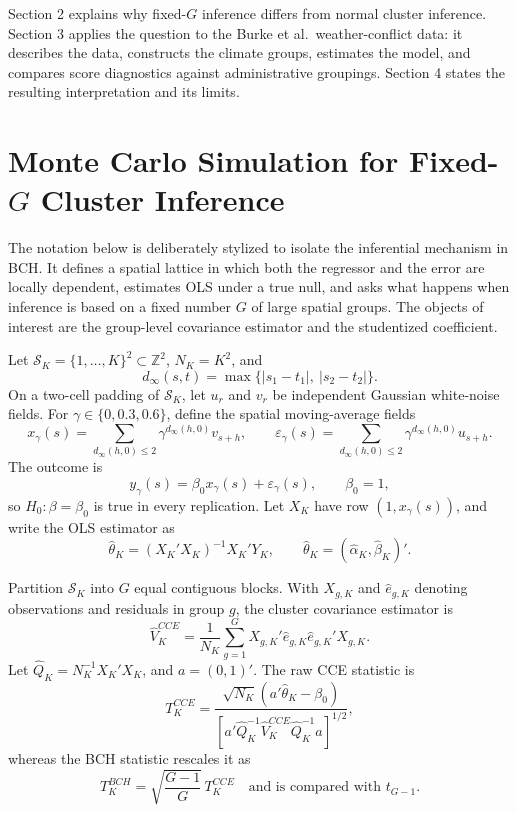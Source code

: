 \documentclass[
]{article}
\begin{document}
Section 2 explains why fixed-\(G\) inference differs from normal cluster
inference. Section 3 applies the question to the Burke et
al.~weather-conflict data: it describes the data, constructs the climate
groups, estimates the model, and compares score diagnostics against
administrative groupings. Section 4 states the resulting interpretation
and its limits.

\section{Monte Carlo Simulation for \texorpdfstring{Fixed-\(G\)}{Fixed-G} Cluster Inference}

The notation below is deliberately stylized to isolate the inferential
mechanism in BCH. It defines a spatial lattice in which both the
regressor and the error are locally dependent, estimates OLS under a
true null, and asks what happens when inference is based on a fixed
number \(G\) of large spatial groups. The objects of interest are the
group-level covariance estimator and the studentized coefficient.

Let \(\mathcal S_K=\{1,\ldots,K\}^2\subset\mathbb Z^2\), \(N_K=K^2\),
and \[
d_\infty(s,t)=\max\{|s_1-t_1|,\ |s_2-t_2|\}.
\] On a two-cell padding of \(\mathcal S_K\), let \(u_r\) and \(v_r\) be
independent Gaussian white-noise fields. For \(\gamma\in\{0,0.3,0.6\}\),
define the spatial moving-average fields \[
x_\gamma(s)=\sum_{d_\infty(h,0)\leq 2}\gamma^{d_\infty(h,0)}v_{s+h},
\qquad
\varepsilon_\gamma(s)=\sum_{d_\infty(h,0)\leq 2}\gamma^{d_\infty(h,0)}u_{s+h}.
\] The outcome is \[
y_\gamma(s)=\beta_0x_\gamma(s)+\varepsilon_\gamma(s),\qquad \beta_0=1,
\] so \(H_0:\beta=\beta_0\) is true in every replication. Let \(X_K\)
have row \((1,x_\gamma(s))\), and write the OLS estimator as \[
\widehat\theta_K=(X_K'X_K)^{-1}X_K'Y_K,\qquad
\widehat\theta_K=(\widehat\alpha_K,\widehat\beta_K)'.
\]

Partition \(\mathcal S_K\) into \(G\) equal contiguous blocks. With
\(X_{g,K}\) and \(\widehat e_{g,K}\) denoting observations and residuals
in group \(g\), the cluster covariance estimator is \[
\widehat V_K^{CCE}
=\frac{1}{N_K}\sum_{g=1}^{G}X_{g,K}'\widehat e_{g,K}\widehat e_{g,K}'X_{g,K}.
\] Let \(\widehat Q_K=N_K^{-1}X_K'X_K\), and \(a=(0,1)'\). The raw CCE
statistic is \[
T_K^{CCE}=
\frac{\sqrt{N_K}(a'\widehat\theta_K-\beta_0)}
{\left[a'\widehat Q_K^{-1}\widehat V_K^{CCE}\widehat Q_K^{-1}a\right]^{1/2}},
\] whereas the BCH statistic rescales it as \[
T_K^{BCH}=\sqrt{\frac{G-1}{G}}\,T_K^{CCE}
\quad\text{and is compared with }t_{G-1}.
\]
\end{document}
